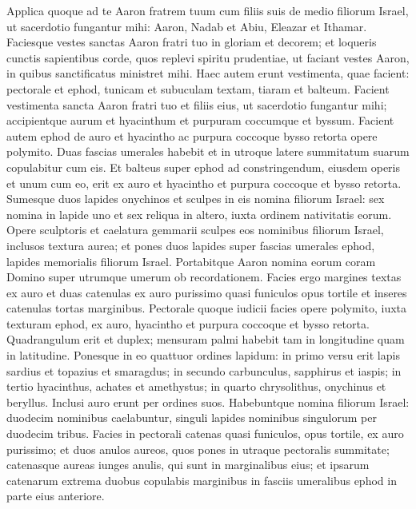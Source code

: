 \begin{biblechapter}  
\verse Applica quoque ad te Aaron fratrem tuum cum filiis suis de medio filiorum Israel, ut sacerdotio fungantur mihi: Aaron, Nadab et Abiu, Eleazar et Ithamar. 
\verse Faciesque vestes sanctas Aaron fratri tuo in gloriam et decorem; 
\verse et loqueris cunctis sapientibus corde, quos replevi spiritu prudentiae, ut faciant vestes Aaron, in quibus sanctificatus ministret mihi. 
\verse Haec autem erunt vestimenta, quae facient: pectorale et ephod, tunicam et subuculam textam, tiaram et balteum. Facient vestimenta sancta Aaron fratri tuo et filiis eius, ut sacerdotio fungantur mihi; 
\verse accipientque aurum et hyacinthum et purpuram coccumque et byssum. 
\verse Facient autem ephod de auro et hyacintho ac purpura coccoque bysso retorta opere polymito. 
\verse Duas fascias umerales habebit et in utroque latere summitatum suarum copulabitur cum eis. 
\verse Et balteus super ephod ad constringendum, eiusdem operis et unum cum eo, erit ex auro et hyacintho et purpura coccoque et bysso retorta. 
\verse Sumesque duos lapides onychinos et sculpes in eis nomina filiorum Israel: 
\verse sex nomina in lapide uno et sex reliqua in altero, iuxta ordinem nativitatis eorum. 
\verse Opere sculptoris et caelatura gemmarii sculpes eos nominibus filiorum Israel, inclusos textura aurea; 
\verse et pones duos lapides super fascias umerales ephod, lapides memorialis filiorum Israel. Portabitque Aaron nomina eorum coram Domino super utrumque umerum ob recordationem. 
\verse Facies ergo margines textas ex auro  
\verse et duas catenulas ex auro purissimo quasi funiculos opus tortile et inseres catenulas tortas marginibus. 
\verse Pectorale quoque iudicii facies opere polymito, iuxta texturam ephod, ex auro, hyacintho et purpura coccoque et bysso retorta. 
\verse Quadrangulum erit et duplex; mensuram palmi habebit tam in longitudine quam in latitudine. 
\verse Ponesque in eo quattuor ordines lapidum: in primo versu erit lapis sardius et topazius et smaragdus; 
\verse in secundo carbunculus, sapphirus et iaspis;  
\verse in tertio hyacinthus, achates et amethystus; 
\verse in quarto chrysolithus, onychinus et beryllus. Inclusi auro erunt per ordines suos. 
\verse Habebuntque nomina filiorum Israel: duodecim nominibus caelabuntur, singuli lapides nominibus singulorum per duodecim tribus. 
\verse Facies in pectorali catenas quasi funiculos, opus tortile, ex auro purissimo; 
\verse et duos anulos aureos, quos pones in utraque pectoralis summitate; 
\verse catenasque aureas iunges anulis, qui sunt in marginalibus eius; 
\verse et ipsarum catenarum extrema duobus copulabis marginibus in fasciis umeralibus ephod in parte eius anteriore.  

\end{biblechapter}
